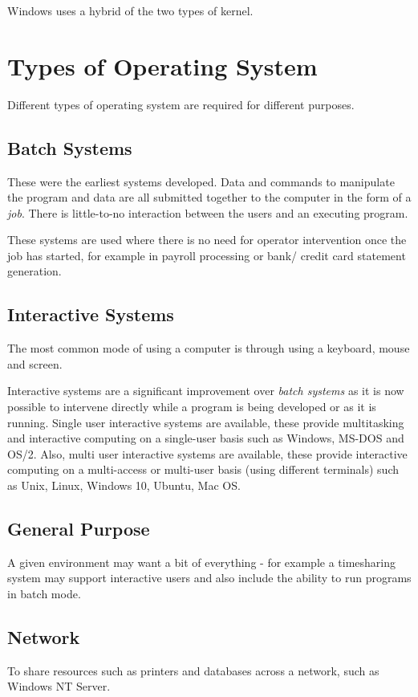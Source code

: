 Windows uses a hybrid of the two types of kernel.

\section*{Types of Operating System}
Different types of operating system are required for different purposes.
\subsection*{Batch Systems}
These were the earliest systems developed. Data and commands to manipulate the program and data are all submitted together to the computer in the form of a \textit{job}. There is little-to-no interaction between the users and an executing program.

These systems are used where there is no need for operator intervention once the job has started, for example in payroll processing or bank/ credit card statement generation. 

\subsection*{Interactive Systems}
The most common mode of using a computer is through using a keyboard, mouse and screen.

Interactive systems are a significant improvement over \textit{batch systems} as it is now possible to intervene directly while a program is being developed or as it is running. Single user interactive systems are available, these provide multitasking and interactive computing on a single-user basis such as Windows, MS-DOS and OS/2. Also, multi user interactive systems are available, these provide interactive computing on a multi-access or multi-user basis (using different terminals) such as Unix, Linux, Windows 10, Ubuntu, Mac OS. 

\subsection*{General Purpose}
A given environment may want a bit of everything - for example a timesharing system may support interactive users and also include the ability to run programs in batch mode.

\subsection*{Network}
To share resources such as printers and databases across a network, such as Windows NT Server.

